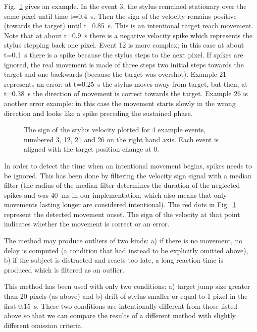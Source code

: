 \documentclass[10pt,letterpaper]{article}
\begin{document}
Fig.~\ref{alt_method_move_dirn} gives an example. In the event 3, the
stylus remained stationary over the same pixel until time
t=0.4~s. Then the sign of the velocity remains positive (towards the
target) until t=0.85~s. This is an intentional target reach
movement. Note that at about t=0.9~s there is a negative velocity spike
which represents the stylus stepping back one pixel. Event 12 is more
complex; in this case at about t=0.1~s there is a spike because the
stylus steps to the next pixel. If spikes are ignored, the real
movement is made of three steps two initial steps towards the target
and one backwards (because the target was overshot). Example 21
represents an error: at t=0.25~s the stylus moves away from target,
but then, at t=0.38~s the direction of movement is correct towards the
target. Example 26 is another error example: in this case the movement
starts slowly in the wrong direction and looks like a spike preceding
the sustained phase.

\begin{figure}[htb!]
\centering
\caption[Alternative method] {The sign of the stylus velocity plotted
  for 4 example events, numbered 3, 12, 21 and 26 on the right hand
  axis. Each event is aligned with the target position change at 0.}
\label{alt_method_move_dirn}
\end{figure}

In order to detect the time when an intentional movement begins,
spikes needs to be ignored. This has been done by filtering the
velocity sign signal with a median filter (the radius of the median
filter determines the duration of the neglected spikes and was 40~ms
in our implementation, which also means that only movements lasting
longer are considered intentional). The red dots in
Fig.~\ref{alt_method_move_dirn} represent the detected movement
onset. The sign of the velocity at that point indicates whether the
movement is correct or an error.

The method may produce outliers of two kinds: a) if there is no
movement, no delay is computed (a condition that had instead to be
explicitly omitted above), b) if the subject is distracted and reacts
too late, a long reaction time is produced which is filtered as an
outlier.

This method has been used with only two conditions: a) target
jump size greater than 20 pixels (as above) and b) drift of stylus
smaller or equal to 1 pixel in the first 0.15~s. These two conditions
are intentionally different from those listed above so that we can
compare the results of a different method with slightly different
omission criteria.
\end{document}
